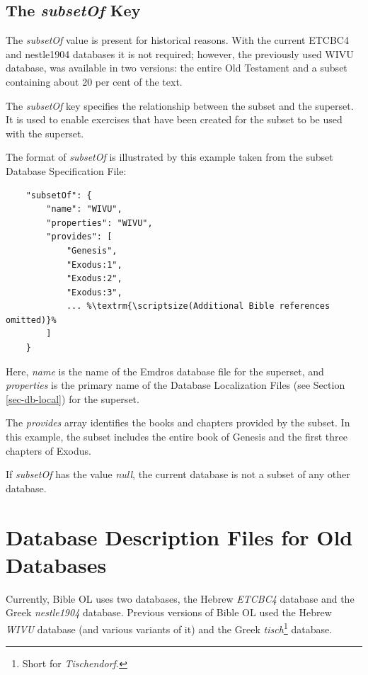 \documentclass[11pt,oneside,a4paper]{memoir}
\begin{document}
\subsection{The \emph{subsetOf} Key}\label{subsetof}

The \emph{subsetOf} value is present for historical reasons. With the current ETCBC4 and nestle1904
databases it is not required; however, the previously used WIVU database, was available in two
versions: the entire Old Testament and a subset containing about 20 per cent of the text.

The \emph{subsetOf} key specifies the relationship between the subset and the superset. It is used
to enable exercises that have been created for the subset to be used with the superset.

The format of \emph{subsetOf} is illustrated by this example taken from the subset Database
Specification File:

\begin{lstlisting}
    "subsetOf": {
        "name": "WIVU",
        "properties": "WIVU",
        "provides": [
            "Genesis",
            "Exodus:1",
            "Exodus:2",
            "Exodus:3",
            ... %\textrm{\scriptsize(Additional Bible references omitted)}%
        ]
    }
\end{lstlisting}

Here, \emph{name} is the name of the Emdros database file for the superset, and \emph{properties} is
the primary name of the Database Localization Files (see Section \ref{sec-db-local}) for the superset.

The \emph{provides} array identifies the books and chapters provided by the subset. In this example,
the subset includes the entire book of Genesis and the first three chapters of Exodus.

If \emph{subsetOf} has the value \emph{null}, the current database is not a subset of any other
database.

\section{Database Description Files for Old Databases}\label{sec-old-db}

Currently, Bible OL uses two databases, the Hebrew \emph{ETCBC4} database and the Greek
\emph{nestle1904} database. Previous versions of Bible OL used the Hebrew \emph{WIVU} database (and
various variants of it) and the Greek \emph{tisch}\footnote{Short for \emph{Tischendorf.}} database.
\end{document}
